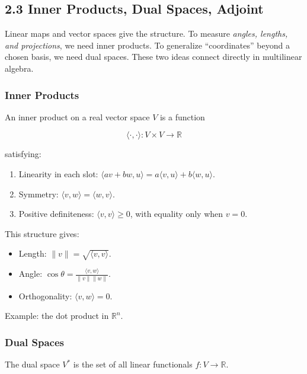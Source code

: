 \documentclass[
  letterpaper,
  DIV=11,
  numbers=noendperiod]{scrreprt}
\providecommand{\tightlist}{%
  \setlength{\itemsep}{0pt}\setlength{\parskip}{0pt}}
\begin{document}
\subsection{2.3 Inner Products, Dual Spaces,
Adjoint}\label{inner-products-dual-spaces-adjoint}

Linear maps and vector spaces give the structure. To measure
\emph{angles, lengths, and projections}, we need inner products. To
generalize ``coordinates'' beyond a chosen basis, we need dual spaces.
These two ideas connect directly in multilinear algebra.

\subsubsection{Inner Products}\label{inner-products}

An inner product on a real vector space \(V\) is a function

\[
\langle \cdot, \cdot \rangle : V \times V \to \mathbb{R}
\]

satisfying:

\begin{enumerate}
\def\labelenumi{\arabic{enumi}.}
\tightlist
\item
  Linearity in each slot:
  \(\langle av+ bw, u\rangle = a\langle v,u\rangle + b\langle w,u\rangle\).
\item
  Symmetry: \(\langle v, w \rangle = \langle w, v \rangle\).
\item
  Positive definiteness: \(\langle v,v\rangle \geq 0\), with equality
  only when \(v=0\).
\end{enumerate}

This structure gives:

\begin{itemize}
\tightlist
\item
  Length: \(\|v\| = \sqrt{\langle v,v\rangle}\).
\item
  Angle: \(\cos\theta = \frac{\langle v,w\rangle}{\|v\|\|w\|}\).
\item
  Orthogonality: \(\langle v,w\rangle=0\).
\end{itemize}

Example: the dot product in \(\mathbb{R}^n\).

\subsubsection{Dual Spaces}\label{dual-spaces}

The dual space \(V^*\) is the set of all linear functionals
\(f: V \to \mathbb{R}\).
\end{document}
